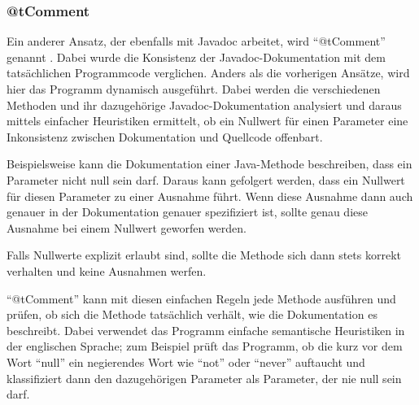 \subsubsection{@tComment}\label{@tComment}
Ein anderer Ansatz, der ebenfalls mit Javadoc arbeitet, wird \enquote{@tComment} genannt \cite[S.~1ff.]{@tComment:TestingJavadocCommentstoDetectComment-CodeInconsistencies}. Dabei wurde die Konsistenz der Javadoc-Dokumentation mit dem tatsächlichen Programmcode verglichen. Anders als die vorherigen Ansätze, wird hier das Programm dynamisch ausgeführt. Dabei werden die verschiedenen Methoden und ihr dazugehörige Javadoc-Dokumentation analysiert und daraus mittels einfacher Heuristiken ermittelt, ob ein  Nullwert für einen Parameter eine Inkonsistenz zwischen Dokumentation und Quellcode offenbart.

Beispielsweise kann die Dokumentation einer Java-Methode beschreiben, dass ein Parameter nicht null sein darf. Daraus kann gefolgert werden, dass ein Nullwert für diesen Parameter zu einer Ausnahme führt. Wenn diese Ausnahme dann auch genauer in der Dokumentation genauer spezifiziert ist, sollte genau diese Ausnahme bei einem Nullwert geworfen werden. 

Falls Nullwerte explizit erlaubt sind, sollte die Methode sich dann stets korrekt verhalten und keine Ausnahmen werfen. 

\enquote{@tComment} kann mit diesen einfachen Regeln jede Methode ausführen und prüfen, ob sich die Methode tatsächlich verhält, wie die Dokumentation es beschreibt. Dabei verwendet das Programm einfache  semantische Heuristiken in der englischen Sprache; zum Beispiel prüft das Programm, ob die kurz vor dem Wort \enquote{null} ein negierendes Wort wie \enquote{not} oder \enquote{never} auftaucht und klassifiziert dann den dazugehörigen Parameter als Parameter, der nie null sein darf. 
